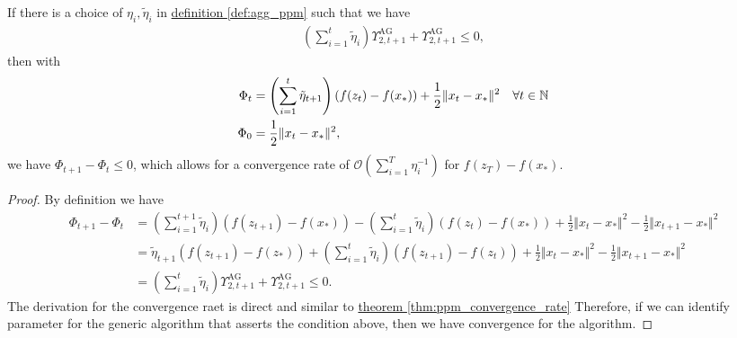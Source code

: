 \documentclass[12pt]{article}
\begin{document}
        \begin{theorem}\label{thm:generic_smooth_ag_convergence}
            If there is a choice of $\eta_i, \tilde \eta_i$ in \hyperref[def:agg_ppm]{definition \ref*{def:agg_ppm}} such that we have 
            \begin{align*}
                \left(
                    \sum_{i = 1}^{t} \tilde \eta_i
                \right)\Upsilon_{2, t + 1}^{\text{AG}} + \Upsilon_{2, t + 1}^{\text{AG}} \le 0, 
            \end{align*}
            then with 
            \begin{align*}
                \Phi_t &= \left(
                    \sum_{i = 1}^{t} \tilde\eta_{t + 1}
                \right) (f(z_t) - f(x_*)) + \frac{1}{2}\Vert x_t - x_*\Vert^2 \quad \forall t \in \mathbb N
                \\
                \Phi_0 &= \frac{1}{2}\Vert x_t - x_*\Vert^2, 
            \end{align*}
            we have $\Phi_{t + 1} - \Phi_t \le 0$, which allows for a convergence rate of $\mathcal O \left(\sum_{i = 1}^{T} \eta_i^{-1}\right)$ for $f(z_T) - f(x_*)$. 
        \end{theorem}
        \begin{proof}
            By definition we have
            {\footnotesize
            \begin{align*}
                \Phi_{t + 1} - \Phi_t 
                &= 
                \left(
                    \sum_{i = 1}^{t+1} \tilde\eta_{i}
                \right) (f(z_{t + 1}) - f(x_*)) 
                - 
                \left(
                    \sum_{i = 1}^{t} \tilde\eta_{i}
                \right) (f(z_{t}) - f(x_*)) 
                + \frac{1}{2}\Vert x_t - x_*\Vert^2
                - \frac{1}{2}\Vert x_{t + 1} - x_*\Vert^2
                \\
                &= 
                \tilde \eta_{t + 1} (f(z_{t + 1}) - f(z_*))
                +
                \left(
                    \sum_{i = 1}^{t} \tilde \eta_i
                \right)(f(z_{t + 1}) - f(z_t))
                + \frac{1}{2}\Vert x_t - x_*\Vert^2
                - \frac{1}{2}\Vert x_{t + 1} - x_*\Vert^2
                \\
                &= \left(
                    \sum_{i = 1}^{t} \tilde \eta_i
                \right)\Upsilon_{2, t + 1}^{\text{AG}} + \Upsilon_{2, t + 1}^{\text{AG}} \le 0. 
            \end{align*}
            }
            The derivation for the convergence raet is direct and similar to 
            \hyperref[thm:ppm_convergence_rate]{theorem \ref*{thm:ppm_convergence_rate}} 
            Therefore, if we can identify parameter for the generic algorithm that asserts the condition above, then we have convergence for the algorithm. 
        \end{proof}
\end{document}
